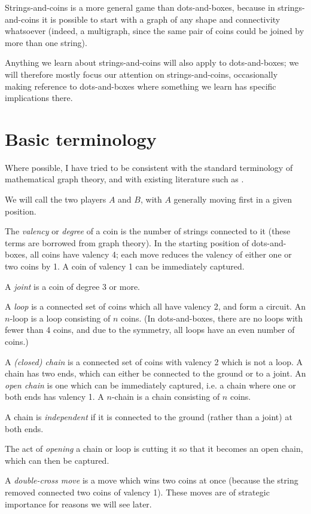 \documentclass[a4paper,twocolumn]{article}
\begin{document}
Strings-and-coins is a more general game than dots-and-boxes, because
in strings-and-coins it is possible to start with a graph of any shape
and connectivity whatsoever (indeed, a multigraph, since the same pair
of coins could be joined by more than one string).

Anything we learn about strings-and-coins will also apply to
dots-and-boxes; we will therefore mostly focus our attention on
strings-and-coins, occasionally making reference to dots-and-boxes
where something we learn has specific implications there.

\section{Basic terminology}

Where possible, I have tried to be consistent with the standard
terminology of mathematical graph theory, and with existing literature
such as \cite{berl}.

We will call the two players $A$ and $B$, with $A$ generally moving
first in a given position.

The \emph{valency} or \emph{degree} of a coin is the number of strings
connected to it (these terms are borrowed from graph theory). In the
starting position of dots-and-boxes, all coins have valency 4; each
move reduces the valency of either one or two coins by 1. A coin of
valency 1 can be immediately captured.

A \emph{joint} is a coin of degree 3 or more.

A \emph{loop} is a connected set of coins which all have valency 2, and
form a circuit. An $n$-loop is a loop consisting of $n$ coins. (In
dots-and-boxes, there are no loops with fewer than 4 coins, and due to
the symmetry, all loops have an even number of coins.)

A \emph{(closed) chain} is a connected set of coins with valency 2
which is not a loop. A chain has two ends, which can either be
connected to the ground or to a joint. An \emph{open chain} is one
which can be immediately captured, i.e. a chain where one or both ends
has valency 1. A $n$-chain is a chain consisting of $n$ coins.

A chain is \emph{independent} if it is connected to the ground (rather
than a joint) at both ends.

The act of \emph{opening} a chain or loop is cutting it so that it
becomes an open chain, which can then be captured.

A \emph{double-cross move} is a move which wins two coins at once
(because the string removed connected two coins of valency 1). These
moves are of strategic importance for reasons we will see later.
\end{document}
